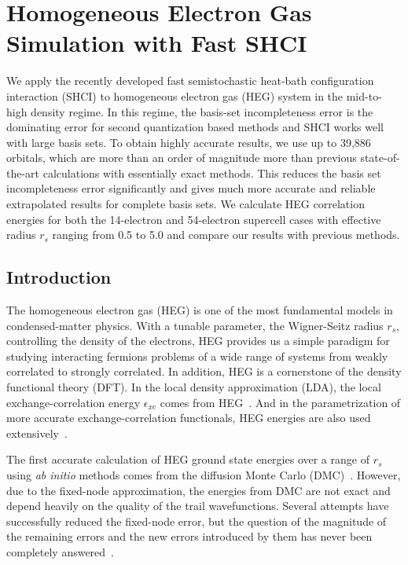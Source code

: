 \chapter{Homogeneous Electron Gas Simulation with Fast SHCI}

We apply the recently developed fast semistochastic heat-bath configuration interaction (SHCI) to homogeneous electron gas (HEG) system in the mid-to-high density regime.
In this regime, the basis-set incompleteness error is the dominating error for second quantization based methods and SHCI works well with large basis sets.
To obtain highly accurate results, we use up to 39,886 orbitals, which are more than an order of magnitude more than previous state-of-the-art calculations with essentially exact methods.
This reduces the basis set incompleteness error significantly and gives much more accurate and reliable extrapolated results for complete basis sets.
We calculate HEG correlation energies for both the 14-electron and 54-electron supercell cases with effective radius $r_s$ ranging from 0.5 to 5.0 and compare our results with previous methods.

\section{Introduction}
The homogeneous electron gas (HEG) is one of the most fundamental models in condensed-matter physics.
With a tunable parameter, the Wigner-Seitz radius $r_s$, controlling the density of the electrons, HEG provides us a simple paradigm for studying interacting fermions problems of a wide range of systems from weakly correlated to strongly correlated.
In addition, HEG is a cornerstone of the density functional theory (DFT).
In the local density approximation (LDA), the local exchange-correlation energy $\epsilon_{xc}$ comes from HEG~\cite{perdew1986density, dahl2013local}. 
And in the parametrization of more accurate exchange-correlation functionals, HEG energies are also used extensively~\cite{lundqvist2013theory}.

The first accurate calculation of HEG ground state energies over a range of $r_s$ using \textit{ab initio} methods comes from the diffusion Monte Carlo (DMC)~\cite{ceperley1980ground}. However, due to the fixed-node approximation, the energies from DMC are not exact and depend heavily on the quality of the trail wavefunctions.
Several attempts have successfully reduced the fixed-node error, but the question of the magnitude of the remaining errors and the new errors introduced by them has never been completely answered~\cite{kwon1998effects, rios2006inhomogeneous}.

